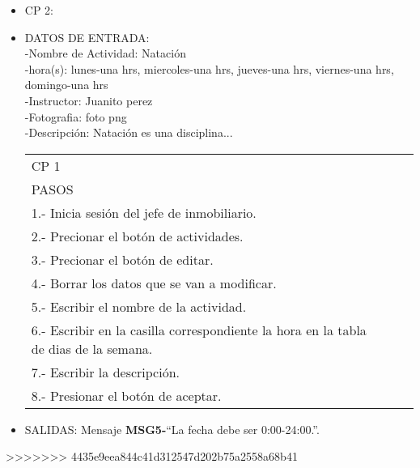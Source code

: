 \begin{itemize}
	\item CP 2:
	\item DATOS DE ENTRADA:\\
	-Nombre de Actividad: Natación\\
	-hora(s): lunes-una hrs, miercoles-una hrs, jueves-una hrs, viernes-una hrs, domingo-una hrs\\
	-Instructor: Juanito perez\\
	-Fotografia: foto png\\
	-Descripción: Natación es una disciplina...
	\begin{center}			
		\begin{tabular}{|l|l|l|l|}
			\hline
			CP 1\\
			PASOS\\
			\hline 1.- Inicia sesión del jefe de inmobiliario.\\
			\hline 2.- Precionar el botón de actividades.\\
			\hline 3.- Precionar el botón de editar.\\
			\hline 4.- Borrar los datos que se van a modificar.\\
			\hline 5.- Escribir el  nombre de la actividad.\\
			\hline 6.- Escribir en la casilla correspondiente la hora en la tabla
			de dias de la semana.\\
			\hline 7.- Escribir la descripción.\\
			\hline 8.- Presionar el botón de aceptar.\\
			\hline
		\end{tabular}
	\end{center}
	\item SALIDAS: Mensaje {\bf MSG5-}``La fecha debe ser 0:00-24:00.''.
	
\end{itemize}
>>>>>>> 4435e9eea844c41d312547d202b75a2558a68b41
